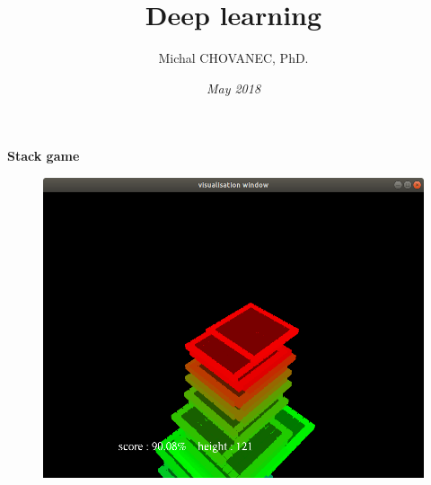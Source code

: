 \documentclass[xcolor=dvipsnames]{beamer}
\title{\bf Deep learning}
\author{Michal CHOVANEC, PhD.}
\date[EURP]{\it May 2018}
\begin{document}
\begin{frame}
\titlepage
{}
\end{frame}

\begin{frame}{\bf Stack game}

\begin{figure}
\centering
\includegraphics[scale=0.32]{stack.png}
\end{figure}

\end{frame}
\end{document}
